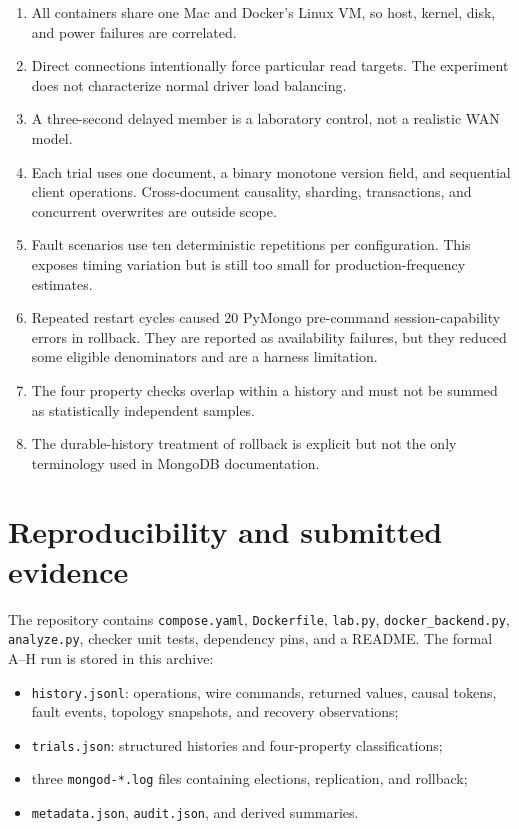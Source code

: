 \documentclass[11pt,a4paper]{article}
\begin{document}
\begin{enumerate}
  \item All containers share one Mac and Docker's Linux VM, so host, kernel, disk, and power
  failures are correlated.
  \item Direct connections intentionally force particular read targets. The experiment does
  not characterize normal driver load balancing.
  \item A three-second delayed member is a laboratory control, not a realistic WAN model.
  \item Each trial uses one document, a binary monotone version field, and sequential client
  operations. Cross-document causality, sharding, transactions, and concurrent overwrites
  are outside scope.
  \item Fault scenarios use ten deterministic repetitions per configuration. This exposes
  timing variation but is still too small for production-frequency estimates.
  \item Repeated restart cycles caused 20 PyMongo pre-command session-capability errors in
  rollback. They are reported as availability failures, but they reduced some eligible
  denominators and are a harness limitation.
  \item The four property checks overlap within a history and must not be summed as
  statistically independent samples.
  \item The durable-history treatment of rollback is explicit but not the only terminology
  used in MongoDB documentation.
\end{enumerate}

\section{Reproducibility and submitted evidence}

The repository contains \texttt{compose.yaml}, \texttt{Dockerfile}, \texttt{lab.py},
\texttt{docker\_backend.py}, \texttt{analyze.py}, checker unit tests, dependency pins, and a
README. The formal A--H run is stored in this archive:
\begin{center}
\small{}
\end{center}

\begin{itemize}
  \item \texttt{history.jsonl}: operations, wire commands, returned values, causal tokens,
  fault events, topology snapshots, and recovery observations;
  \item \texttt{trials.json}: structured histories and four-property classifications;
  \item three \texttt{mongod-*.log} files containing elections, replication, and rollback;
  \item \texttt{metadata.json}, \texttt{audit.json}, and derived summaries.
\end{itemize}
\end{document}
